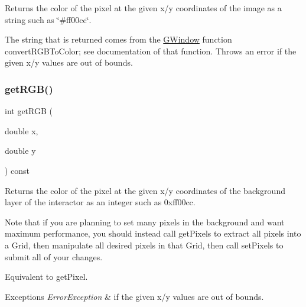 Returns the color of the pixel at the given x/y coordinates of the image as a string such as \char`\"{}\#ff00cc\char`\"{}. 

The string that is returned comes from the {\ttfamily \mbox{\hyperlink{classsgl_1_1GWindow}{G\+Window}}} function {\ttfamily convert\+R\+G\+B\+To\+Color}; see documentation of that function. Throws an error if the given x/y values are out of bounds. \mbox{\label{classsgl_1_1GDrawingSurface_a9e983467cf0c97cfd62433a8471570dc}} 
\subsubsection{\texorpdfstring{get\+R\+G\+B()}{getRGB()}}
{\footnotesize\ttfamily int get\+R\+GB (\begin{DoxyParamCaption}\item[{double}]{x,  }\item[{double}]{y }\end{DoxyParamCaption}) const\hspace{0.3cm}{\ttfamily [virtual]}}



Returns the color of the pixel at the given x/y coordinates of the background layer of the interactor as an integer such as 0xff00cc. 

Note that if you are planning to set many pixels in the background and want maximum performance, you should instead call get\+Pixels to extract all pixels into a Grid, then manipulate all desired pixels in that Grid, then call set\+Pixels to submit all of your changes.

Equivalent to get\+Pixel.


\begin{DoxyExceptions}{Exceptions}
{\em Error\+Exception} & if the given x/y values are out of bounds. \\
\hline
\end{DoxyExceptions}
\mbox{\label{classsgl_1_1GDrawingSurface_a456d3582acc3544f37d939f5cb8802fe}} 
